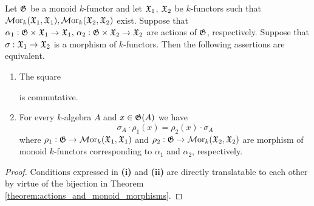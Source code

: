 \begin{proposition}\label{proposition:morphism_of_monoid_actions}
Let ${\mathfrak G}$ be a monoid $k$-functor and let ${\mathfrak X}_1$, ${\mathfrak X}_2$ be $k$-functors such that $\mathcal{M}\mathrm{or}_k({\mathfrak X}_1,{\mathfrak X}_1),\mathcal{M}\mathrm{or}_k({\mathfrak X}_2,{\mathfrak X}_2)$ exist. Suppose that $\alpha_1:{\mathfrak G}\times {\mathfrak X}_1 \rightarrow {\mathfrak X}_1,\,\alpha_2:{\mathfrak G}\times {\mathfrak X}_2 \rightarrow {\mathfrak X}_2$ are actions of ${\mathfrak G}$, respectively. Suppose that $\sigma:{\mathfrak X}_1\rightarrow {\mathfrak X}_2$ is a morphism of $k$-functors. Then the following assertions are equivalent.
\begin{enumerate}[label=\emph{\textbf{(\roman*)}}, leftmargin=3.0em]
\item The square
\begin{center}
\end{center}
is commutative.
\item For every $k$-algebra $A$ and $x\in {\mathfrak G}(A)$ we have
$$\sigma_A \cdot \rho_1(x) = \rho_2(x) \cdot \sigma_A$$
where $\rho_1:{\mathfrak G}\rightarrow \mathcal{M}\mathrm{or}_k({\mathfrak X}_1,{\mathfrak X}_1)$ and $\rho_2:{\mathfrak G}\rightarrow \mathcal{M}\mathrm{or}_{k}({\mathfrak X}_2,{\mathfrak X}_2)$ are morphism of monoid $k$-functors corresponding to $\alpha_1$ and $\alpha_2$, respectively.
\end{enumerate}
\end{proposition}
\begin{proof}
Conditions expressed in \textbf{(i)} and \textbf{(ii)} are directly translatable to each other by virtue of the bijection in Theorem \ref{theorem:actions_and_monoid_morphisms}. 
\end{proof}

